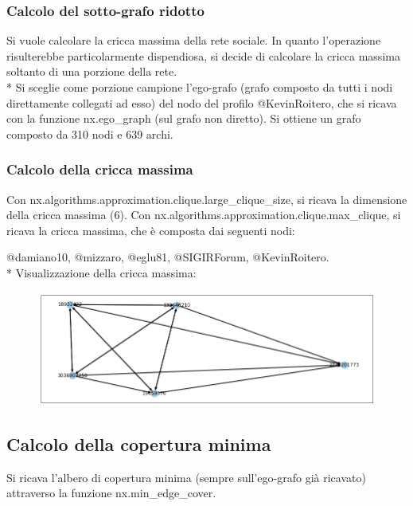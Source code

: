 \documentclass[a4paper, 12pt, twoside]{article}
\begin{document}
\subsubsection{Calcolo del sotto-grafo ridotto}
Si vuole calcolare la cricca massima della rete sociale. In quanto l’operazione risulterebbe particolarmente dispendiosa, si decide di calcolare la cricca massima soltanto di una porzione della rete. \\*
Si sceglie come porzione campione l’ego-grafo (grafo composto da tutti i nodi direttamente collegati ad esso) del nodo del profilo @KevinRoitero, che si ricava con la funzione nx.ego\_graph (sul grafo non diretto). Si ottiene un grafo composto da 310 nodi e 639 archi.

\subsubsection{Calcolo della cricca massima}%
Con nx.algorithms.approximation.clique.large\_clique\_size, si ricava la dimensione della  cricca massima (6). Con nx.algorithms.approximation.clique.max\_clique, si ricava la cricca massima, che è composta dai seguenti nodi: 

@damiano10, @mizzaro, @eglu81, @SIGIRForum, @KevinRoitero. \\*
Visualizzazione della cricca massima:

\begin{figure}[h]
    \centering
    \includegraphics[scale=0.4]{images/max clique.png} %
    \label{fig:cricca_max}
\end{figure}


\subsection{Calcolo della copertura minima}
Si ricava l’albero di copertura minima (sempre sull’ego-grafo già ricavato) attraverso la funzione nx.min\_edge\_cover. 
\end{document}
